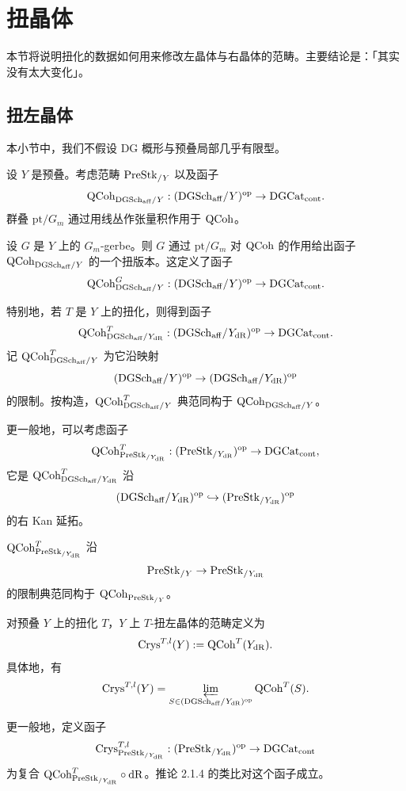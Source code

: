 \chapter{扭晶体}

本节将说明扭化的数据如何用来修改左晶体与右晶体的范畴。主要结论是：「其实没有太大变化」。

\section{扭左晶体}

本小节中，我们不假设 DG 概形与预叠局部几乎有限型。

设 $Y$ 是预叠。考虑范畴 $\mathrm{PreStk}_{/Y}$ 以及函子
\[
\mathrm{QCoh}_{\mathrm{DGSch}_{\mathrm{aff}}/Y}:(\mathrm{DGSch}_{\mathrm{aff}}/Y)^{\mathrm{op}}\to\mathrm{DGCat}_{\mathrm{cont}}.
\]
群叠 $\mathrm{pt}/G_m$ 通过用线丛作张量积作用于 $\mathrm{QCoh}$。

设 $G$ 是 $Y$ 上的 $G_m$-gerbe。则 $G$ 通过 $\mathrm{pt}/G_m$ 对 $\mathrm{QCoh}$ 的作用给出函子 $\mathrm{QCoh}_{\mathrm{DGSch}_{\mathrm{aff}}/Y}$ 的一个扭版本。这定义了函子
\[
\mathrm{QCoh}^G_{\mathrm{DGSch}_{\mathrm{aff}}/Y}:(\mathrm{DGSch}_{\mathrm{aff}}/Y)^{\mathrm{op}}\to\mathrm{DGCat}_{\mathrm{cont}}.
\]

特别地，若 $T$ 是 $Y$ 上的扭化，则得到函子
\[
\mathrm{QCoh}^T_{\mathrm{DGSch}_{\mathrm{aff}}/Y_{\mathrm{dR}}}:(\mathrm{DGSch}_{\mathrm{aff}}/Y_{\mathrm{dR}})^{\mathrm{op}}\to\mathrm{DGCat}_{\mathrm{cont}}.
\]
记 $\mathrm{QCoh}^T_{\mathrm{DGSch}_{\mathrm{aff}}/Y}$ 为它沿映射
\[
(\mathrm{DGSch}_{\mathrm{aff}}/Y)^{\mathrm{op}}\to(\mathrm{DGSch}_{\mathrm{aff}}/Y_{\mathrm{dR}})^{\mathrm{op}}
\]
的限制。按构造，$\mathrm{QCoh}^T_{\mathrm{DGSch}_{\mathrm{aff}}/Y}$ 典范同构于 $\mathrm{QCoh}_{\mathrm{DGSch}_{\mathrm{aff}}/Y}$。

更一般地，可以考虑函子
\[
\mathrm{QCoh}^T_{\mathrm{PreStk}_{/Y_{\mathrm{dR}}}}:(\mathrm{PreStk}_{/Y_{\mathrm{dR}}})^{\mathrm{op}}\to\mathrm{DGCat}_{\mathrm{cont}},
\]
它是 $\mathrm{QCoh}^T_{\mathrm{DGSch}_{\mathrm{aff}}/Y_{\mathrm{dR}}}$ 沿
\[
(\mathrm{DGSch}_{\mathrm{aff}}/Y_{\mathrm{dR}})^{\mathrm{op}}\hookrightarrow(\mathrm{PreStk}_{/Y_{\mathrm{dR}}})^{\mathrm{op}}
\]
的右 Kan 延拓。

$\mathrm{QCoh}^T_{\mathrm{PreStk}_{/Y_{\mathrm{dR}}}}$ 沿
\[
\mathrm{PreStk}_{/Y}\to\mathrm{PreStk}_{/Y_{\mathrm{dR}}}
\]
的限制典范同构于 $\mathrm{QCoh}_{\mathrm{PreStk}_{/Y}}$。

对预叠 $Y$ 上的扭化 $T$，$Y$ 上 $T$-扭左晶体的范畴定义为
\[
\mathrm{Crys}^{T,l}(Y):=\mathrm{QCoh}^T(Y_{\mathrm{dR}}).
\]
具体地，有
\[
\mathrm{Crys}^{T,l}(Y)=\varprojlim_{S\in(\mathrm{DGSch}_{\mathrm{aff}}/Y_{\mathrm{dR}})^{\mathrm{op}}}\mathrm{QCoh}^T(S).
\]

更一般地，定义函子
\[
\mathrm{Crys}^{T,l}_{\mathrm{PreStk}_{/Y_{\mathrm{dR}}}}:(\mathrm{PreStk}_{/Y_{\mathrm{dR}}})^{\mathrm{op}}\to\mathrm{DGCat}_{\mathrm{cont}}
\]
为复合 $\mathrm{QCoh}^T_{\mathrm{PreStk}_{/Y_{\mathrm{dR}}}}\circ\mathrm{dR}$。推论 2.1.4 的类比对这个函子成立。

